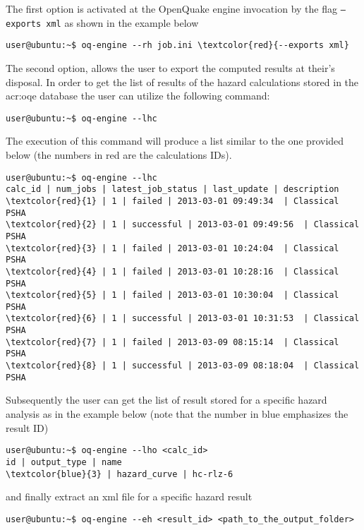 The first option is activated at the OpenQuake engine invocation by 
the flag \texttt{--exports xml} as shown in the example below
\begin{Verbatim}[frame=single, commandchars=\\\{\}, fontsize=\small]
user@ubuntu:~$ oq-engine --rh job.ini \textcolor{red}{--exports xml}
\end{Verbatim}

The second option, allows the user to export the computed results at 
their's disposal.
In order to get the list of results of the hazard calculations stored 
in the \gls{acr:oqe} database the user can utilize the following command:
\begin{Verbatim}[frame=single, commandchars=\\\{\}, fontsize=\small]
user@ubuntu:~$ oq-engine --lhc
\end{Verbatim}
The execution of this command will produce a list similar to the 
one provided below (the numbers in red are the calculations IDs).
\begin{Verbatim}[frame=single, commandchars=\\\{\}, fontsize=\small]
user@ubuntu:~$ oq-engine --lhc
calc_id | num_jobs | latest_job_status | last_update | description
\textcolor{red}{1} | 1 | failed | 2013-03-01 09:49:34  | Classical PSHA
\textcolor{red}{2} | 1 | successful | 2013-03-01 09:49:56  | Classical PSHA
\textcolor{red}{3} | 1 | failed | 2013-03-01 10:24:04  | Classical PSHA
\textcolor{red}{4} | 1 | failed | 2013-03-01 10:28:16  | Classical PSHA
\textcolor{red}{5} | 1 | failed | 2013-03-01 10:30:04  | Classical PSHA
\textcolor{red}{6} | 1 | successful | 2013-03-01 10:31:53  | Classical PSHA
\textcolor{red}{7} | 1 | failed | 2013-03-09 08:15:14  | Classical PSHA
\textcolor{red}{8} | 1 | successful | 2013-03-09 08:18:04  | Classical PSHA
\end{Verbatim}
Subsequently the user can get the list of result stored for a specific 
hazard analysis as in the example below (note that the number in blue 
emphasizes the result ID)
\begin{Verbatim}[frame=single, commandchars=\\\{\}, fontsize=\small]
user@ubuntu:~$ oq-engine --lho <calc_id>
id | output_type | name
\textcolor{blue}{3} | hazard_curve | hc-rlz-6
\end{Verbatim}
and finally extract an xml file for a specific hazard result 
\begin{Verbatim}[frame=single, commandchars=\\\{\}, fontsize=\small]
user@ubuntu:~$ oq-engine --eh <result_id> <path_to_the_output_folder>
\end{Verbatim}



